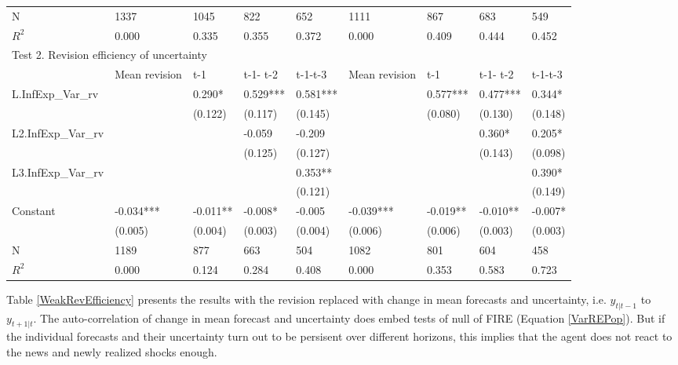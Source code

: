 \documentclass[]{article}
\begin{document}
\begin{table}[ht]
\begin{adjustbox}{angle=90}
\begin{tabular}{lllllllll}
		\hline 
		N                   & 1337          & 1045      & 822      & 652      & 1111          & 867       & 683       & 549       \\
		$R^2$                  & 0.000         & 0.335     & 0.355    & 0.372    & 0.000         & 0.409     & 0.444     & 0.452     \\
		\hline 
		\multicolumn{9}{l}{Test 2. Revision efficiency of uncertainty}                                                            \\
		\hline 
		& Mean revision & t-1       & t-1- t-2 & t-1-t-3  & Mean revision & t-1       & t-1- t-2  & t-1-t-3   \\
		\hline 
		L.InfExp\_Var\_rv   &               & 0.290*    & 0.529*** & 0.581*** &               & 0.577***  & 0.477***  & 0.344*    \\
		&               & (0.122)   & (0.117)  & (0.145)  &               & (0.080)   & (0.130)   & (0.148)   \\
		L2.InfExp\_Var\_rv  &               &           & -0.059   & -0.209   &               &           & 0.360*    & 0.205*    \\
		&               &           & (0.125)  & (0.127)  &               &           & (0.143)   & (0.098)   \\
		L3.InfExp\_Var\_rv  &               &           &          & 0.353**  &               &           &           & 0.390*    \\
		&               &           &          & (0.121)  &               &           &           & (0.149)   \\
		Constant              & -0.034***     & -0.011**  & -0.008*  & -0.005   & -0.039***     & -0.019**  & -0.010**  & -0.007*   \\
		& (0.005)       & (0.004)   & (0.003)  & (0.004)  & (0.006)       & (0.006)   & (0.003)   & (0.003)   \\
		\hline 
		N                   & 1189          & 877       & 663      & 504      & 1082          & 801       & 604       & 458       \\
	$R^2$                 & 0.000         & 0.124     & 0.284    & 0.408    & 0.000         & 0.353     & 0.583     & 0.723    \\
		\hline 
	\end{tabular}
\end{adjustbox}
\end{table}


Table \ref{WeakRevEfficiency} presents the results with the revision replaced with change in mean forecasts and uncertainty, i.e. $y_{t|t-1}$ to $y_{t+1|t}$. The auto-correlation of change in mean forecast and uncertainty does embed  tests of null of FIRE (Equation \ref{VarREPop}). But if the individual forecasts and their uncertainty turn out to be persisent over different horizons, this implies that the agent does not react to the news and newly realized shocks enough. 
\end{document}

